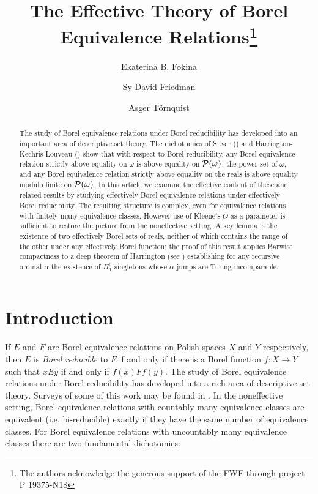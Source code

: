 \documentclass[11pt, english]{article}
\title{The Effective Theory of Borel Equivalence Relations\thanks{The
authors acknowledge the generous support of the FWF through project
P 19375-N18}}
\author{Ekaterina B. Fokina\and Sy-David Friedman\and Asger T\"{o}rnquist}
\begin{document}
\maketitle

\begin{abstract}
The study of Borel equivalence relations under Borel reducibility
has developed into an important area of descriptive set theory. The
dichotomies of Silver (\cite{silver80}) and
Harrington-Kechris-Louveau (\cite{hakelou90}) show that with respect
to Borel reducibility, any Borel equivalence relation strictly above
equality on $\omega$ is above equality on ${\cal P}(\omega)$, the
power set of $\omega$, and any Borel equivalence relation strictly
above equality on the reals is above equality modulo finite on
${\cal P}(\omega)$. In this article we examine the effective content
of these and related results by studying effectively Borel
equivalence relations under effectively Borel reducibility. The
resulting structure is complex, even for equivalence relations with
finitely many equivalence classes. However use of Kleene's $O$ as a
parameter is sufficient to restore the picture from the noneffective
setting. A key lemma is the existence of two effectively Borel sets
of reals, neither of which contains the range of the other under any
effectively Borel function; the proof of this result applies Barwise
compactness to a deep theorem of Harrington (see \cite{hjohar})
establishing for any recursive ordinal $\alpha$ the existence of
$\Pi^0_1$ singletons whose $\alpha$-jumps are Turing incomparable.
\end{abstract}

\section{Introduction}

If $E$ and $F$ are Borel equivalence relations on Polish spaces $X$
and $Y$ respectively, then $E$ is \emph{Borel reducible} to $F$ if
and only if there is a Borel function $f:X\to Y$ such that $xEy$ if
and only if $f(x)Ff(y)$. The study of Borel equivalence relations
under Borel reducibility has developed into a rich area of
descriptive set theory. Surveys of some of this work may be found in
\cite{beke96, gao09, hjorth, hjoke01, kanovei08, Kechris99}. In the
noneffective setting, Borel equivalence relations with countably
many equivalence classes are equivalent (i.e. bi-reducible) exactly
if they have the same number of equivalence classes. For Borel
equivalence relations with uncountably many equivalence classes
there are two fundamental dichotomies:
\end{document}
